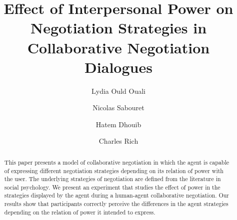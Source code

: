 \documentclass[runningheads,a4paper]{llncs}
\begin{document}
	
	\mainmatter  %
	
	\title{Effect of Interpersonal Power on Negotiation Strategies in Collaborative Negotiation Dialogues}
	
	
	
	\author{Lydia Ould Ouali%
		\and Nicolas Sabouret\and Hatem Dhouib\and Charles Rich}
	
	
	
	
	\maketitle
	
	
	\begin{abstract}
		
		This paper presents a model of collaborative negotiation in which the agent is capable of expressing different negotiation strategies depending on its relation of power with the user. The underlying strategies of negotiation are defined from the literature in social psychology. We present an experiment that studies the effect of power in the strategies displayed by the agent during a human-agent collaborative negotiation. Our results show that participants correctly perceive the differences in the agent strategies depending on the relation of power it intended to express.
		
		
	\end{abstract}
	
\end{document}
